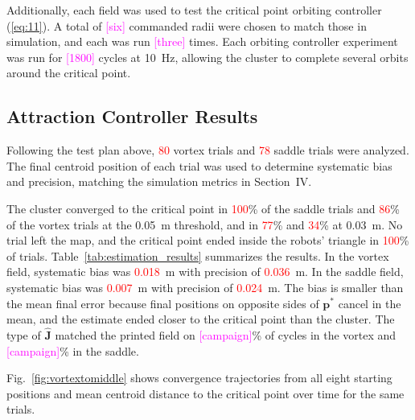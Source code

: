 \documentclass[lettersize,journal]{IEEEtran}
\newcommand{\syn}[1]{\textcolor{red}{#1}}            %
\newcommand{\open}[1]{\textcolor{magenta}{[#1]}}     %
\begin{document}
Additionally, each field was used to test the critical point orbiting controller (\ref{eq:11}). A total of \open{six} commanded radii were chosen to match those in simulation, and each was run \open{three} times. Each orbiting controller experiment was run for \open{1800} cycles at 10~Hz, allowing the cluster to complete several orbits around the critical point. %

 \subsection{Attraction Controller Results}

Following the test plan above, \syn{80} vortex trials and \syn{78} saddle trials were analyzed. The final centroid position of each trial was used to determine systematic bias and precision, matching the simulation metrics in Section~IV. %

The cluster converged to the critical point in \syn{100}\% of the saddle trials and \syn{86}\% of the vortex trials at the 0.05~m threshold, and in \syn{77}\% and \syn{34}\% at 0.03~m. No trial left the map, and the critical point ended inside the robots' triangle in \syn{100}\% of trials. Table~\ref{tab:estimation_results} summarizes the results. In the vortex field, systematic bias was \syn{0.018}~m with precision of \syn{0.036}~m. In the saddle field, systematic bias was \syn{0.007}~m with precision of \syn{0.024}~m. The bias is smaller than the mean final error because final positions on opposite sides of $\mathbf{p}^*$ cancel in the mean, and the estimate ended closer to the critical point than the cluster. The type of $\hat{\mathbf{J}}$ matched the printed field on \open{campaign}\% of cycles in the vortex and \open{campaign}\% in the saddle. %

Fig.~\ref{fig:vortextomiddle} shows convergence trajectories from all eight starting positions and mean centroid distance to the critical point over time for the same trials.
\end{document}
